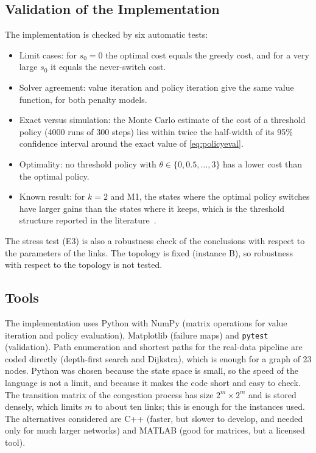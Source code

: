 \subsection{Validation of the Implementation}

The implementation is checked by six automatic tests:
\begin{itemize}
  \item Limit cases: for $s_0 = 0$ the optimal cost equals the greedy cost, and for a very large $s_0$ it equals the never-switch cost.
  \item Solver agreement: value iteration and policy iteration give the same value function, for both penalty models.
  \item Exact versus simulation: the Monte Carlo estimate of the cost of a threshold policy (4000 runs of 300 steps) lies within twice the half-width of its 95\% confidence interval around the exact value of \eqref{eq:policyeval}.
  \item Optimality: no threshold policy with $\theta \in \{0, 0.5, \dots, 3\}$ has a lower cost than the optimal policy.
  \item Known result: for $k = 2$ and M1, the states where the optimal policy switches have larger gains than the states where it keeps, which is the threshold structure reported in the literature~\cite{anjali2002,hamouda2020}.
\end{itemize}
The stress test (E3) is also a robustness check of the conclusions with respect to the parameters of the links. The topology is fixed (instance B), so robustness with respect to the topology is not tested.

\subsection{Tools}

The implementation uses Python with NumPy (matrix operations for value iteration and policy evaluation), Matplotlib (failure maps) and \texttt{pytest} (validation). Path enumeration and shortest paths for the real-data pipeline are coded directly (depth-first search and Dijkstra), which is enough for a graph of 23 nodes. Python was chosen because the state space is small, so the speed of the language is not a limit, and because it makes the code short and easy to check. The transition matrix of the congestion process has size $2^m \times 2^m$ and is stored densely, which limits $m$ to about ten links; this is enough for the instances used. The alternatives considered are C++ (faster, but slower to develop, and needed only for much larger networks) and MATLAB (good for matrices, but a licensed tool).